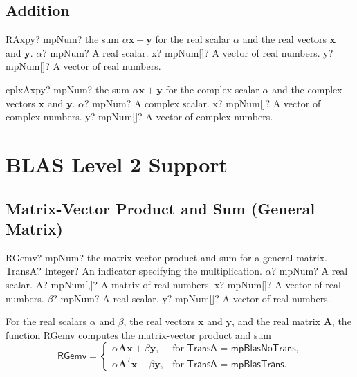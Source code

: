\subsection{Addition}

\begin{mpFunctionsExtract}
	\mpFunctionThree
	{RAxpy? mpNum?  the sum $\alpha \boldsymbol{x} + \boldsymbol{y}$ for the real scalar $\alpha$ and the real vectors $\boldsymbol{x}$ and $\boldsymbol{y}$.}
	{$\alpha$? mpNum? A real scalar.}
	{x? mpNum[]? A vector of real numbers.}
	{y? mpNum[]? A vector of real numbers.}
\end{mpFunctionsExtract}

\vspace{0.6cm}
\begin{mpFunctionsExtract}
	\mpFunctionThree
	{cplxAxpy? mpNum? the sum $\alpha \boldsymbol{x} + \boldsymbol{y}$ for the complex scalar $\alpha$ and the complex vectors $\boldsymbol{x}$ and $\boldsymbol{y}$.}
	{$\alpha$? mpNum? A complex scalar.}
	{x? mpNum[]? A vector of complex numbers.}
	{y? mpNum[]? A vector of complex numbers.}
\end{mpFunctionsExtract}




\section{BLAS Level 2 Support}
\label{BLASSupportLevel2}

\subsection{Matrix-Vector Product and Sum (General Matrix)}

\begin{mpFunctionsExtract}
	\mpFunctionSix
	{RGemv? mpNum? the matrix-vector product and sum for a general matrix.}
	{TransA? Integer? An indicator specifying the multiplication.}
	{$\alpha$? mpNum? A real scalar.}
	{A? mpNum[,]? A matrix of real numbers.}
	{x? mpNum[]? A vector of real numbers.}
	{$\beta$? mpNum? A real scalar.}
	{y? mpNum[]? A vector of real numbers.}
\end{mpFunctionsExtract}

\vspace{0.3cm}
For the real scalars $\alpha$ and $\beta$, the real vectors $\boldsymbol{x}$ and $\boldsymbol{y}$, and the real matrix $\boldsymbol{A}$, the function \textsf{RGemv} computes the matrix-vector product and sum 
\begin{equation}
\textsf{RGemv}=\begin{cases}
\alpha \boldsymbol{A} \boldsymbol{x} + \beta \boldsymbol{y}, & \text{for } \textsf{TransA = mpBlasNoTrans},\\
\alpha \boldsymbol{A}^T \boldsymbol{x} + \beta \boldsymbol{y}, & \text{for } \textsf{TransA = mpBlasTrans}.
\end{cases}
\end{equation}


